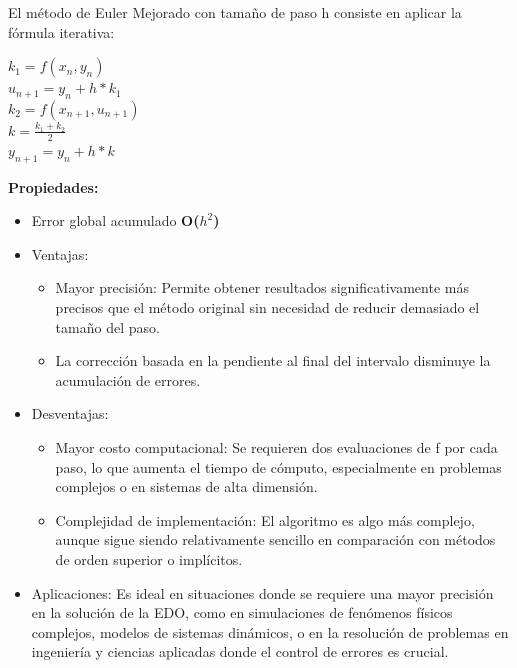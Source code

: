 \documentclass[12pt,a4paper]{article}
\begin{document}
    \vspace*{0.5cm}
    El método de Euler Mejorado con tamaño de paso h consiste en aplicar la fórmula iterativa:\\
    \begin{center}
         $ k_1 = f(x_n,y_n)$\\
         $u_{n+1} = y_n + h * k_1$\\
         $k_2 = f(x_{n+1},u_{n+1})$\\
         \vspace*{0.2cm}
         $k = \frac{k_1 + k_2}{2}$\\
         $y_{n+1} = y_n + h * k$\\
    \end{center}
    \textbf{Propiedades:}
    \begin{itemize}
        \item Error global acumulado \textbf{O($h^2$)}
        \item Ventajas:
        \begin{itemize}
            \item Mayor precisión: Permite obtener resultados significativamente más precisos que el método original sin necesidad de reducir demasiado el tamaño del paso.
            \item La corrección basada en la pendiente al final del intervalo disminuye la acumulación de errores.
        \end{itemize}
        \item Desventajas:
        \begin{itemize}
            \item Mayor costo computacional: Se requieren dos evaluaciones de f por cada paso, lo que aumenta el tiempo de cómputo, especialmente en problemas complejos o en sistemas de alta dimensión.
            \item Complejidad de implementación: El algoritmo es algo más complejo, aunque sigue siendo relativamente sencillo en comparación con métodos de orden superior o implícitos.
        \end{itemize}
        \item Aplicaciones: Es ideal en situaciones donde se requiere una mayor precisión en la solución de la EDO, como en simulaciones de fenómenos físicos complejos, modelos de sistemas dinámicos, o en la resolución de problemas en ingeniería y ciencias aplicadas donde el control de errores es crucial.
    \end{itemize}
\end{document}
